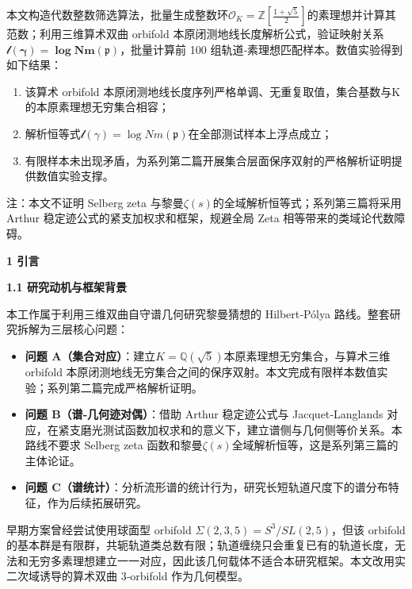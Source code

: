 \documentclass[12pt]{article}
\begin{document}
本文构造代数整数筛选算法，批量生成整数环\(\mathcal{O}_{K} = \mathbb{Z}\left\lbrack \frac{1 + \sqrt{5}}{2} \right\rbrack\)的素理想并计算其范数；利用三维算术双曲
orbifold
本原闭测地线长度解析公式，验证映射关系\(\mathcal{l}\left( \mathbf{\gamma} \right)\mathbf{= \log Nm}\left( \mathfrak{p} \right)\)，批量计算前
100 组轨道‑素理想匹配样本。数值实验得到如下结果：

\begin{enumerate}
\def\labelenumi{\arabic{enumi}.}
\item
  该算术 orbifold
  本原闭测地线长度序列严格单调、无重复取值，集合基数与K的本原素理想无穷集合相容；
\item
  解析恒等式\(\mathcal{l}(\gamma) = \log Nm\left( \mathfrak{p} \right)\)在全部测试样本上浮点成立；
\item
  有限样本未出现矛盾，为系列第二篇开展集合层面保序双射的严格解析证明提供数值实验支撑。
\end{enumerate}

注：本文不证明 Selberg zeta
与黎曼\(\zeta(s)\)的全域解析恒等式；系列第三篇将采用 Arthur
稳定迹公式的紧支加权求和框架，规避全局 Zeta 相等带来的类域论代数障碍。

\textbf{1 引言}

\textbf{1.1 研究动机与框架背景}

本工作属于利用三维双曲自守谱几何研究黎曼猜想的 Hilbert‑Pólya
路线。整套研究拆解为三层核心问题：

\begin{itemize}
\item
  \textbf{问题
  A（集合对应）}：建立\(K = \mathbb{Q}\left( \sqrt{5} \right)\)本原素理想无穷集合，与算术三维
  orbifold
  本原闭测地线无穷集合之间的保序双射。本文完成有限样本数值实验；系列第二篇完成严格解析证明。
\item
  \textbf{问题 B（谱‑几何迹对偶）}：借助 Arthur 稳定迹公式与
  Jacquet‑Langlands
  对应，在紧支磨光测试函数加权求和的意义下，建立谱侧与几何侧等价关系。本路线不要求
  Selberg zeta
  函数和黎曼\(\zeta(s)\)全域解析恒等，这是系列第三篇的主体论证。
\item
  \textbf{问题
  C（谱统计）}：分析流形谱的统计行为，研究长短轨道尺度下的谱分布特征，作为后续拓展研究。
\end{itemize}

早期方案曾经尝试使用球面型 orbifold
\(\Sigma(2,3,5) = S^{3}/SL(2,5)\)，但该 orbifold
的基本群是有限群，共轭轨道类总数有限；轨道缠绕只会重复已有的轨道长度，无法和无穷多素理想建立一一对应，因此该几何载体不适合本研究框架。本文改用实二次域诱导的算术双曲
3‑orbifold 作为几何模型。
\end{document}
